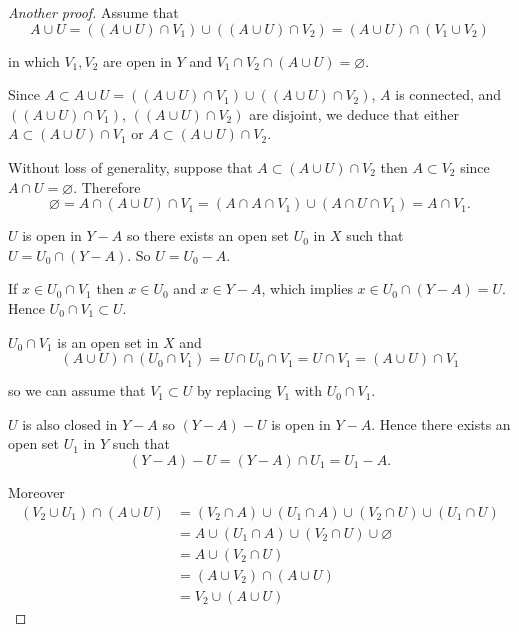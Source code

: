 \begin{proof}[Another proof]
	Assume that
	\[
		A\cup U = ((A \cup U) \cap V_{1}) \cup ((A \cup U) \cap V_{2}) = (A \cup U) \cap (V_{1} \cup V_{2})
	\]

	in which \( V_{1}, V_{2} \) are open in \(Y\) and \( V_{1} \cap V_{2} \cap (A \cup U) = \varnothing \).

	Since \( A \subset A \cup U = ((A \cup U) \cap V_{1}) \cup ((A \cup U) \cap V_{2}) \), \( A \) is connected, and \( ((A \cup U) \cap V_{1}) \), \( ((A \cup U) \cap V_{2}) \) are disjoint, we deduce that either \( A \subset (A \cup U) \cap V_{1} \) or \( A \subset (A \cup U) \cap V_{2} \).

	Without loss of generality, suppose that \( A \subset (A \cup U) \cap V_{2} \) then \( A \subset V_{2} \) since \( A \cap U = \varnothing \). Therefore
	\[
		\varnothing = A \cap (A \cup U) \cap V_{1} = (A \cap A \cap V_{1}) \cup (A \cap U \cap V_{1}) = A \cap V_{1}.
	\]

	\( U \) is open in \( Y - A \) so there exists an open set \( U_{0} \) in \(X\) such that \( U = U_{0} \cap (Y - A) \). So \( U = U_{0} - A \).

	If \( x \in U_{0} \cap V_{1} \) then \( x \in U_{0} \) and \( x \in Y - A \), which implies \( x \in U_{0} \cap (Y - A) = U \). Hence \( U_{0} \cap V_{1} \subset U \).

	\( U_{0} \cap V_{1} \) is an open set in \( X \) and
	\[
		(A \cup U) \cap (U_{0} \cap V_{1}) = U \cap U_{0} \cap V_{1} = U \cap V_{1} = (A \cup U) \cap V_{1}
	\]

	so we can assume that \( V_{1} \subset U \) by replacing \( V_{1} \) with \( U_{0} \cap V_{1} \).

	\( U \) is also closed in \( Y - A \) so \( (Y - A) - U \) is open in \( Y - A \). Hence there exists an open set \( U_{1} \) in \( Y \) such that
	\[
		(Y - A) - U = (Y - A) \cap U_{1} = U_{1} - A.
	\]

	Moreover
	\begingroup
	\allowdisplaybreaks%
	\begin{align*}
		(V_{2} \cup U_{1}) \cap (A \cup U) & = (V_{2} \cap A) \cup (U_{1} \cap A) \cup (V_{2} \cap U) \cup (U_{1} \cap U) \\
		                                   & = A \cup (U_{1} \cap A) \cup (V_{2} \cap U) \cup \varnothing                 \\
		                                   & = A \cup (V_{2} \cap U)                                                      \\
		                                   & = (A \cup V_{2}) \cap (A \cup U)                                             \\
		                                   & = V_{2} \cup (A \cup U)
	\end{align*}
	\endgroup


\end{proof}
